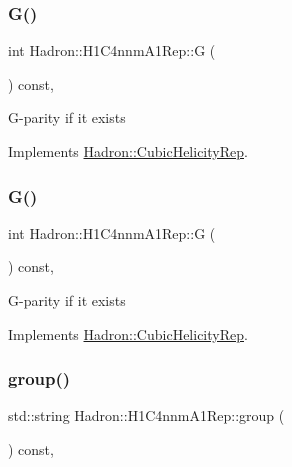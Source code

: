 \subsubsection{\texorpdfstring{G()}{G()}\hspace{0.1cm}{\footnotesize\ttfamily [1/2]}}
{\footnotesize\ttfamily int Hadron\+::\+H1\+C4nnm\+A1\+Rep\+::G (\begin{DoxyParamCaption}{ }\end{DoxyParamCaption}) const\hspace{0.3cm}{\ttfamily [inline]}, {\ttfamily [virtual]}}

G-\/parity if it exists 

Implements \mbox{\hyperlink{structHadron_1_1CubicHelicityRep_a50689f42be1e6170aa8cf6ad0597018b}{Hadron\+::\+Cubic\+Helicity\+Rep}}.

\mbox{\label{structHadron_1_1H1C4nnmA1Rep_ac499e4a61baff357ee922f30244b8067}} 
\subsubsection{\texorpdfstring{G()}{G()}\hspace{0.1cm}{\footnotesize\ttfamily [2/2]}}
{\footnotesize\ttfamily int Hadron\+::\+H1\+C4nnm\+A1\+Rep\+::G (\begin{DoxyParamCaption}{ }\end{DoxyParamCaption}) const\hspace{0.3cm}{\ttfamily [inline]}, {\ttfamily [virtual]}}

G-\/parity if it exists 

Implements \mbox{\hyperlink{structHadron_1_1CubicHelicityRep_a50689f42be1e6170aa8cf6ad0597018b}{Hadron\+::\+Cubic\+Helicity\+Rep}}.

\mbox{\label{structHadron_1_1H1C4nnmA1Rep_ac58ca1a17658ee7043603fb04a470665}} 
\subsubsection{\texorpdfstring{group()}{group()}\hspace{0.1cm}{\footnotesize\ttfamily [1/3]}}
{\footnotesize\ttfamily std\+::string Hadron\+::\+H1\+C4nnm\+A1\+Rep\+::group (\begin{DoxyParamCaption}{ }\end{DoxyParamCaption}) const\hspace{0.3cm}{\ttfamily [inline]}, {\ttfamily [virtual]}}

